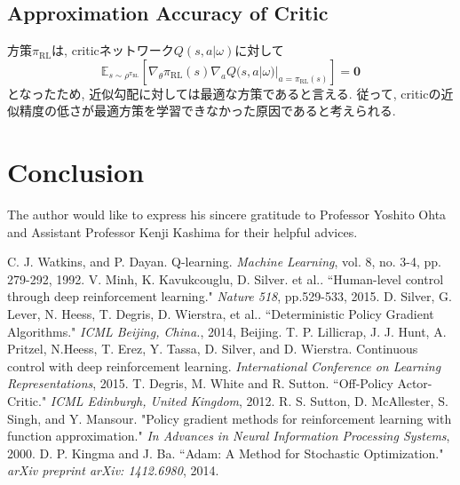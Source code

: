 \documentclass[english, dvipdfmx]{ampmt}             %
\newcommand{\expect}{\mathbb{E}}
\begin{document}
\subsection{Approximation Accuracy of Critic}
方策$\pi_{\textrm{RL}}$は, criticネットワーク$Q(s,a|\omega)$に対して
\begin{equation}
	\expect_{s\sim\rho^{\pi_{\textrm{RL}}}}[
	\nabla_{\theta}\pi_{\textrm{RL}}(s)\nabla_{a}Q(s,a|\omega)|_{a=\pi_{\textrm{RL}}(s)}] = \bm{0} 
\end{equation}
となったため, 近似勾配に対しては最適な方策であると言える. 従って, criticの近似精度の低さが最適方策を学習できなかった原因であると考えられる. 




\section{Conclusion}


\acknowledgment
The author would like to express his sincere gratitude to Professor
Yoshito Ohta and Assistant Professor Kenji Kashima for their helpful advices.

\begin{thebibliography}{10}
C. J. Watkins, and P. Dayan. Q-learning. \textit{Machine Learning}, vol. 8, no. 3-4, pp. 279-292, 1992.
V. Minh, K. Kavukcouglu, D. Silver. et al.. “Human-level control through deep reinforcement learning." \textit{Nature 518}, pp.529-533, 2015.
D. Silver, G. Lever, N. Heess, T. Degris, D. Wierstra, et al.. “Deterministic Policy Gradient Algorithms." \textit{ICML Beijing, China.}, 2014, Beijing.
T. P. Lillicrap, J. J. Hunt, A. Pritzel, N.Heess, T. Erez, Y. Tassa, D. Silver, and D. Wierstra. Continuous control with deep reinforcement learning. \textit{International Conference on Learning Representations}, 2015.
T. Degris, M. White and R. Sutton. “Off-Policy Actor-Critic." \textit{ICML Edinburgh, United Kingdom}, 2012.
R. S. Sutton, D. McAllester, S. Singh, and Y. Mansour. "Policy gradient methods for reinforcement learning with function approximation." \textit{In Advances in Neural Information Processing Systems}, 2000.
D. P. Kingma and J. Ba. “Adam: A Method for Stochastic Optimization." \textit{arXiv preprint arXiv: 1412.6980}, 2014.

\end{thebibliography}
\end{document}

